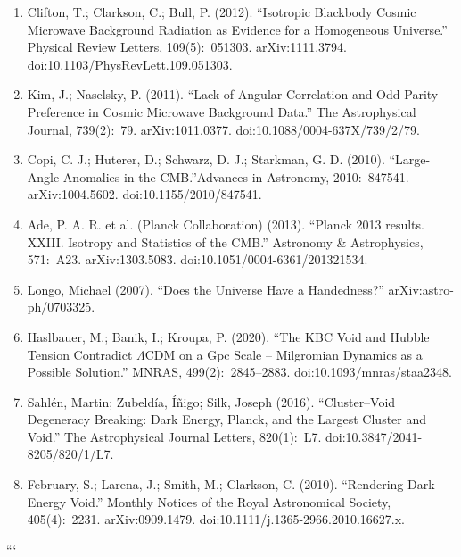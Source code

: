 \begin{enumerate}
    \item Clifton, T.; Clarkson, C.; Bull, P. (2012). “Isotropic Blackbody Cosmic Microwave Background Radiation as Evidence for a Homogeneous Universe.” Physical Review Letters, 109(5):~051303. arXiv:1111.3794. doi:10.1103/PhysRevLett.109.051303.
    \item Kim, J.; Naselsky, P. (2011). “Lack of Angular Correlation and Odd-Parity Preference in Cosmic Microwave Background Data.” The Astrophysical Journal, 739(2):~79. arXiv:1011.0377. doi:10.1088/0004-637X/739/2/79.
    \item Copi, C. J.; Huterer, D.; Schwarz, D. J.; Starkman, G. D. (2010). “Large-Angle Anomalies in the CMB.”Advances in Astronomy, 2010:~847541. arXiv:1004.5602. doi:10.1155/2010/847541.
    \item Ade, P. A. R. et al. (Planck Collaboration) (2013). “Planck 2013 results. XXIII. Isotropy and Statistics of the CMB.” Astronomy \& Astrophysics, 571:~A23. arXiv:1303.5083. doi:10.1051/0004-6361/201321534.
    \item Longo, Michael (2007). “Does the Universe Have a Handedness?” arXiv:astro-ph/0703325.
    \item Haslbauer, M.; Banik, I.; Kroupa, P. (2020). “The KBC Void and Hubble Tension Contradict $\Lambda$CDM on a Gpc Scale – Milgromian Dynamics as a Possible Solution.” MNRAS, 499(2):~2845–2883. doi:10.1093/mnras/staa2348.
    \item Sahlén, Martin; Zubeldía, Íñigo; Silk, Joseph (2016). “Cluster–Void Degeneracy Breaking: Dark Energy, Planck, and the Largest Cluster and Void.” The Astrophysical Journal Letters, 820(1):~L7. doi:10.3847/2041-8205/820/1/L7.
    \item February, S.; Larena, J.; Smith, M.; Clarkson, C. (2010). “Rendering Dark Energy Void.” Monthly Notices of the Royal Astronomical Society, 405(4):~2231. arXiv:0909.1479. doi:10.1111/j.1365-2966.2010.16627.x.
\end{enumerate}
```
